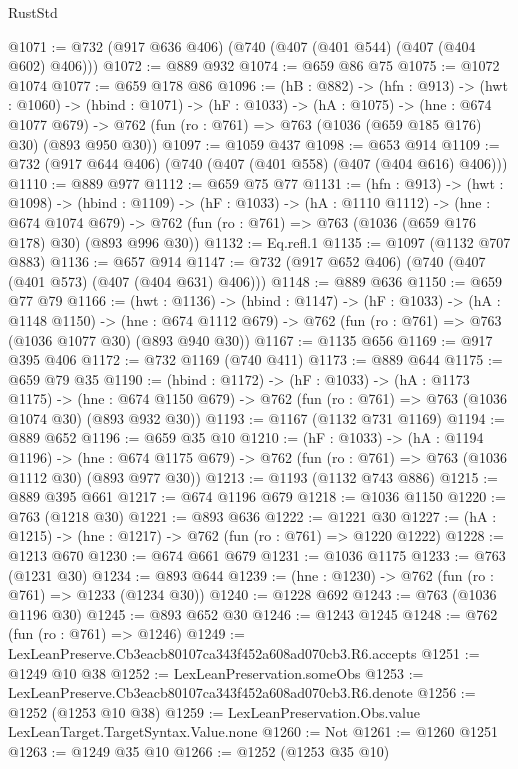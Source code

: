 \begin{lexlean}{RustStd}
\begin{coremodule}
@1071 := @732 (@917 @636 @406) (@740 (@407 (@401 @544) (@407 (@404 @602) @406)))
@1072 := @889 @932
@1074 := @659 @86 @75
@1075 := @1072 @1074
@1077 := @659 @178 @86
@1096 := (hB : @882) ->
  (hfn : @913) ->
  (hwt : @1060) ->
  (hbind : @1071) ->
  (hF : @1033) ->
  (hA : @1075) ->
  (hne : @674 @1077 @679) ->
  @762 (fun (ro : @761) => @763 (@1036 (@659 @185 @176) @30) (@893 @950 @30))
@1097 := @1059 @437
@1098 := @653 @914
@1109 := @732 (@917 @644 @406) (@740 (@407 (@401 @558) (@407 (@404 @616) @406)))
@1110 := @889 @977
@1112 := @659 @75 @77
@1131 := (hfn : @913) ->
  (hwt : @1098) ->
  (hbind : @1109) ->
  (hF : @1033) ->
  (hA : @1110 @1112) ->
  (hne : @674 @1074 @679) ->
  @762 (fun (ro : @761) => @763 (@1036 (@659 @176 @178) @30) (@893 @996 @30))
@1132 := Eq.refl.{1}
@1135 := @1097 (@1132 @707 @883)
@1136 := @657 @914
@1147 := @732 (@917 @652 @406) (@740 (@407 (@401 @573) (@407 (@404 @631) @406)))
@1148 := @889 @636
@1150 := @659 @77 @79
@1166 := (hwt : @1136) ->
  (hbind : @1147) ->
  (hF : @1033) ->
  (hA : @1148 @1150) ->
  (hne : @674 @1112 @679) -> @762 (fun (ro : @761) => @763 (@1036 @1077 @30) (@893 @940 @30))
@1167 := @1135 @656
@1169 := @917 @395 @406
@1172 := @732 @1169 (@740 @411)
@1173 := @889 @644
@1175 := @659 @79 @35
@1190 := (hbind : @1172) ->
  (hF : @1033) ->
  (hA : @1173 @1175) ->
  (hne : @674 @1150 @679) -> @762 (fun (ro : @761) => @763 (@1036 @1074 @30) (@893 @932 @30))
@1193 := @1167 (@1132 @731 @1169)
@1194 := @889 @652
@1196 := @659 @35 @10
@1210 := (hF : @1033) ->
  (hA : @1194 @1196) ->
  (hne : @674 @1175 @679) -> @762 (fun (ro : @761) => @763 (@1036 @1112 @30) (@893 @977 @30))
@1213 := @1193 (@1132 @743 @886)
@1215 := @889 @395 @661
@1217 := @674 @1196 @679
@1218 := @1036 @1150
@1220 := @763 (@1218 @30)
@1221 := @893 @636
@1222 := @1221 @30
@1227 := (hA : @1215) -> (hne : @1217) -> @762 (fun (ro : @761) => @1220 @1222)
@1228 := @1213 @670
@1230 := @674 @661 @679
@1231 := @1036 @1175
@1233 := @763 (@1231 @30)
@1234 := @893 @644
@1239 := (hne : @1230) -> @762 (fun (ro : @761) => @1233 (@1234 @30))
@1240 := @1228 @692
@1243 := @763 (@1036 @1196 @30)
@1245 := @893 @652 @30
@1246 := @1243 @1245
@1248 := @762 (fun (ro : @761) => @1246)
@1249 := LexLeanPreserve.Cb3eacb80107ca343f452a608ad070cb3.R6.accepts
@1251 := @1249 @10 @38
@1252 := LexLeanPreservation.someObs
@1253 := LexLeanPreserve.Cb3eacb80107ca343f452a608ad070cb3.R6.denote
@1256 := @1252 (@1253 @10 @38)
@1259 := LexLeanPreservation.Obs.value LexLeanTarget.TargetSyntax.Value.none
@1260 := Not
@1261 := @1260 @1251
@1263 := @1249 @35 @10
@1266 := @1252 (@1253 @35 @10)

\end{coremodule}
\end{lexlean}
